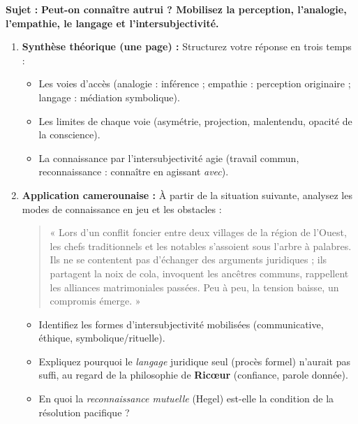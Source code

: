 \documentclass[11pt]{article}
\begin{document}
\begin{exercice}
\textbf{Sujet :} \og \textbf{Peut-on connaître autrui ? Mobilisez la perception, l'analogie, l'empathie, le langage et l'intersubjectivité.} \fg

\begin{enumerate}
    \item \textbf{Synthèse théorique (une page) :} Structurez votre réponse en trois temps :
    \begin{itemize}
        \item Les voies d'accès (analogie : inférence ; empathie : perception originaire ; langage : médiation symbolique).
        \item Les limites de chaque voie (asymétrie, projection, malentendu, opacité de la conscience).
        \item La connaissance par l'intersubjectivité agie (travail commun, reconnaissance : connaître en agissant \emph{avec}).
    \end{itemize}
    \item \textbf{Application camerounaise :} À partir de la situation suivante, analysez les modes de connaissance en jeu et les obstacles :
    \begin{quote}
    « Lors d'un conflit foncier entre deux villages de la région de l'Ouest, les chefs traditionnels et les notables s'assoient sous l'arbre à palabres. Ils ne se contentent pas d'échanger des arguments juridiques ; ils partagent la noix de cola, invoquent les ancêtres communs, rappellent les alliances matrimoniales passées. Peu à peu, la tension baisse, un compromis émerge. »
    \end{quote}
    \begin{itemize}
        \item Identifiez les formes d'intersubjectivité mobilisées (communicative, éthique, symbolique/rituelle).
        \item Expliquez pourquoi le \emph{langage} juridique seul (procès formel) n'aurait pas suffi, au regard de la philosophie de \textbf{Ricœur} (confiance, parole donnée).
        \item En quoi la \emph{reconnaissance mutuelle} (Hegel) est-elle la condition de la résolution pacifique ?
    \end{itemize}
\end{enumerate}
\end{exercice}



\newpage
\end{document}
